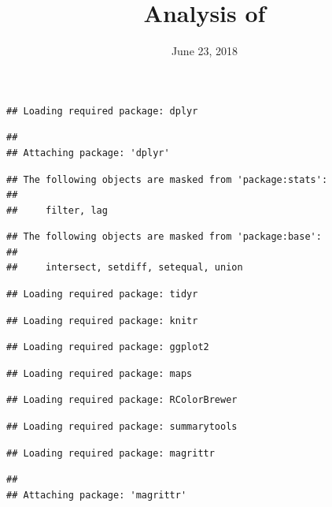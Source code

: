 \documentclass[]{article}
\title{Analysis of}
\author{}
\date{June 23, 2018}
\begin{document}
\maketitle

\newenvironment{sciabstract}{%
\begin{quote} \bf}
{\end{quote}}

\begin{verbatim}
## Loading required package: dplyr
\end{verbatim}

\begin{verbatim}
## 
## Attaching package: 'dplyr'
\end{verbatim}

\begin{verbatim}
## The following objects are masked from 'package:stats':
## 
##     filter, lag
\end{verbatim}

\begin{verbatim}
## The following objects are masked from 'package:base':
## 
##     intersect, setdiff, setequal, union
\end{verbatim}

\begin{verbatim}
## Loading required package: tidyr
\end{verbatim}

\begin{verbatim}
## Loading required package: knitr
\end{verbatim}

\begin{verbatim}
## Loading required package: ggplot2
\end{verbatim}

\begin{verbatim}
## Loading required package: maps
\end{verbatim}

\begin{verbatim}
## Loading required package: RColorBrewer
\end{verbatim}

\begin{verbatim}
## Loading required package: summarytools
\end{verbatim}

\begin{verbatim}
## Loading required package: magrittr
\end{verbatim}

\begin{verbatim}
## 
## Attaching package: 'magrittr'
\end{verbatim}
\end{document}

